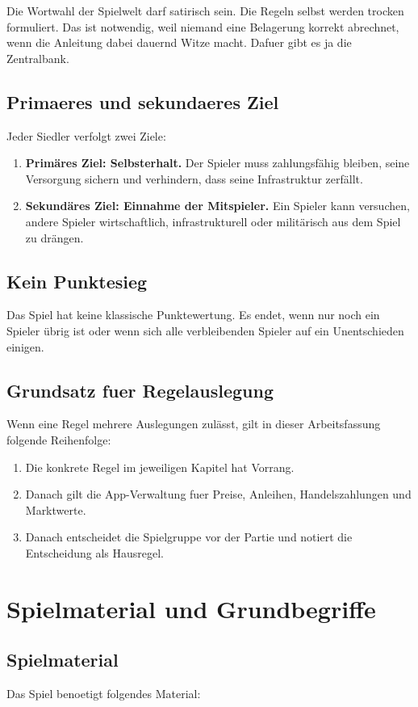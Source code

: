 \documentclass[11pt,a4paper,oneside,parskip=half]{scrreprt}
\newcommand{\begriff}[1]{\textbf{#1}}
\begin{document}
Die Wortwahl der Spielwelt darf satirisch sein. Die Regeln selbst werden trocken formuliert. Das ist notwendig, weil niemand eine Belagerung korrekt abrechnet, wenn die Anleitung dabei dauernd Witze macht. Dafuer gibt es ja die Zentralbank.

\section{Primaeres und sekundaeres Ziel}
Jeder Siedler verfolgt zwei Ziele:
\begin{enumerate}
  \item \begriff{Primäres Ziel: Selbsterhalt.} Der Spieler muss zahlungsfähig bleiben, seine Versorgung sichern und verhindern, dass seine Infrastruktur zerfällt.
  \item \begriff{Sekundäres Ziel: Einnahme der Mitspieler.} Ein Spieler kann versuchen, andere Spieler wirtschaftlich, infrastrukturell oder militärisch aus dem Spiel zu drängen.
\end{enumerate}

\section{Kein Punktesieg}
Das Spiel hat keine klassische Punktewertung. Es endet, wenn nur noch ein Spieler übrig ist oder wenn sich alle verbleibenden Spieler auf ein Unentschieden einigen.

\section{Grundsatz fuer Regelauslegung}
Wenn eine Regel mehrere Auslegungen zulässt, gilt in dieser Arbeitsfassung folgende Reihenfolge:
\begin{enumerate}
  \item Die konkrete Regel im jeweiligen Kapitel hat Vorrang.
  \item Danach gilt die App-Verwaltung fuer Preise, Anleihen, Handelszahlungen und Marktwerte.
  \item Danach entscheidet die Spielgruppe vor der Partie und notiert die Entscheidung als Hausregel.
\end{enumerate}

\chapter{Spielmaterial und Grundbegriffe}

\section{Spielmaterial}
Das Spiel benoetigt folgendes Material:
\end{document}
